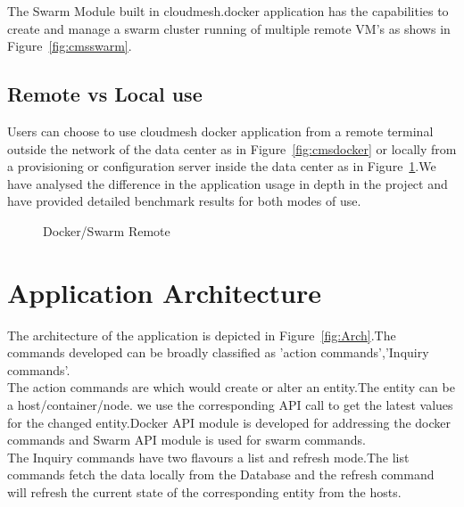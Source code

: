 \documentclass[9pt,twocolumn,twoside]{../../styles/osajnl}
\begin{document}
The Swarm Module built in cloudmesh.docker application has the capabilities to  create and manage a swarm cluster running of multiple remote VM's as shows in Figure~\ref{fig:cmsswarm}. 
\subsection{Remote vs Local use}
Users can choose to use cloudmesh docker application from a remote terminal outside the network of the data center as in Figure~\ref{fig:cmsdocker} or locally from a provisioning or configuration server inside the data center as in Figure~\ref{fig:cmsdocker-2}.We have analysed the difference in the application usage in depth in the project and have provided detailed benchmark results for both modes of use.
\begin{figure}[h!]
\centering
{}
\caption{Docker/Swarm Remote }
\label{fig:cmsdocker-2}
\end{figure}



\section{Application Architecture}
The architecture of the application is depicted in Figure~\ref{fig:Arch}.The commands developed can be broadly classified as 'action commands','Inquiry commands'.\\
The action commands are which would create or alter an entity.The entity can be a host/container/node. we use the corresponding API call to get the latest values for the changed entity.Docker API module is developed for addressing the docker commands and Swarm API module is used for swarm commands.\\
The Inquiry commands have two flavours a list and refresh mode.The list commands fetch the data locally from the Database and the refresh command will refresh the current state of the corresponding entity from the hosts.
\end{document}
